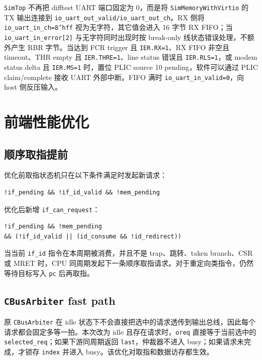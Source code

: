 \documentclass[UTF8,a4paper,11pt]{ctexart}
\begin{document}
\texttt{SimTop} 不再把 difftest UART 端口固定为 0，而是将 \texttt{SimMemoryWithVirtio} 的 TX 输出连接到 \texttt{io\_uart\_out\_valid/io\_uart\_out\_ch}。RX 侧将 \texttt{io\_uart\_in\_ch=8'hff} 视为无字符，其它值会进入 16 字节 RX FIFO；当 \texttt{io\_uart\_in\_error[2]} 与无字符同时出现时按 break-only 线状态错误处理，不额外产生 RBR 字节。当达到 FCR trigger 且 \texttt{IER.RX=1}、RX FIFO 非空且 timeout、THR empty 且 \texttt{IER.THRE=1}、line status 错误且 \texttt{IER.RLS=1}，或 modem status delta 且 \texttt{IER.MS=1} 时，置位 PLIC source 10 pending，软件可以通过 PLIC claim/complete 接收 UART 外部中断。FIFO 满时 \texttt{io\_uart\_in\_valid=0}，向 host 侧反压输入。

\section{前端性能优化}

\subsection{顺序取指提前}

优化前取指状态机只在以下条件满足时发起新请求：

\begin{Verbatim}[fontsize=\small]
!if_pending && !if_id_valid && !mem_pending
\end{Verbatim}

优化后新增 \texttt{if\_can\_request}：

\begin{Verbatim}[fontsize=\small]
!if_pending && !mem_pending
&& (!if_id_valid || (id_consume && !id_redirect))
\end{Verbatim}

当当前 \texttt{if\_id} 指令在本周期被消费，并且不是 trap、跳转、taken branch、CSR 或 MRET 时，CPU 同周期发起下一条顺序取指请求。对于重定向类指令，仍然等待目标写入 \texttt{pc} 后再取指。

\subsection{\texttt{CBusArbiter} fast path}

原 \texttt{CBusArbiter} 在 idle 状态下不会直接把选中的请求透传到输出总线，因此每个请求都会固定多等一拍。本次改为 idle 且存在请求时，\texttt{oreq} 直接等于当前选中的 \texttt{selected\_req}；如果下游同周期返回 \texttt{last}，仲裁器不进入 busy；如果请求未完成，才锁存 \texttt{index} 并进入 busy。该优化对取指和数据访存都生效。
\end{document}
